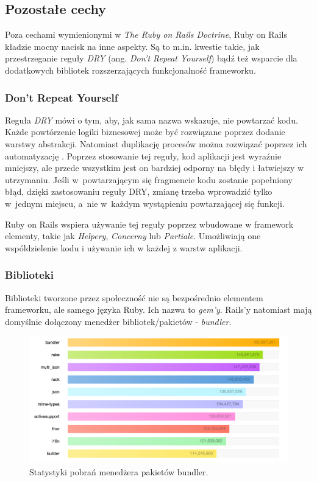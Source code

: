 \documentclass[mgr,oneside]{mgr}
\begin{document}
\subsection{Pozostałe cechy}
Poza cechami wymienionymi w \textit{The Ruby on Rails Doctrine}, Ruby on Rails kładzie mocny nacisk na inne aspekty. Są to m.in. kwestie takie, jak przestrzeganie reguły \textit{DRY} (ang. \textit{Don't Repeat Yourself}) bądź też wsparcie dla dodatkowych bibliotek rozszerzających funkcjonalność frameworku.

\subsubsection{Don't Repeat Yourself}
Reguła \textit{DRY} mówi o tym, aby, jak sama nazwa wskazuje, nie powtarzać kodu. Każde powtórzenie logiki biznesowej może być rozwiązane poprzez dodanie warstwy abstrakcji. Natomiast duplikację procesów można rozwiązać poprzez ich automatyzację \cite{dry}. Poprzez stosowanie tej reguły, kod aplikacji jest wyraźnie mniejszy, ale przede wszystkim jest on bardziej odporny na błędy i łatwiejszy w utrzymaniu. Jeśli w~powtarzającym się fragmencie kodu zostanie popełniony błąd, dzięki zastosowaniu reguły DRY, zmianę trzeba wprowadzić tylko w~jednym miejscu, a~nie w~każdym wystąpieniu powtarzającej się funkcji.

Ruby on Rails wspiera używanie tej reguły poprzez wbudowane w framework elementy, takie jak \textit{Helpery}, \textit{Concerny} lub \textit{Partiale}. Umożliwiają one wspóldzielenie kodu i używanie ich w każdej z warstw aplikacji.

\subsubsection{Biblioteki}
Biblioteki tworzone przez społeczność nie są bezpośrednio elementem frameworku, ale samego języka Ruby. Ich nazwa to \textit{gem'y}. Rails'y natomiast mają domyślnie dołączony menedżer bibliotek/pakietów - \textit{bundler}.

\begin{figure}[h]
  \centering
  \includegraphics[width=\linewidth]{images/bundler_stats}
  \caption{Statystyki pobrań menedżera pakietów bundler.}
  \label{fig:bundler_stats}
\end{figure}
\end{document}
